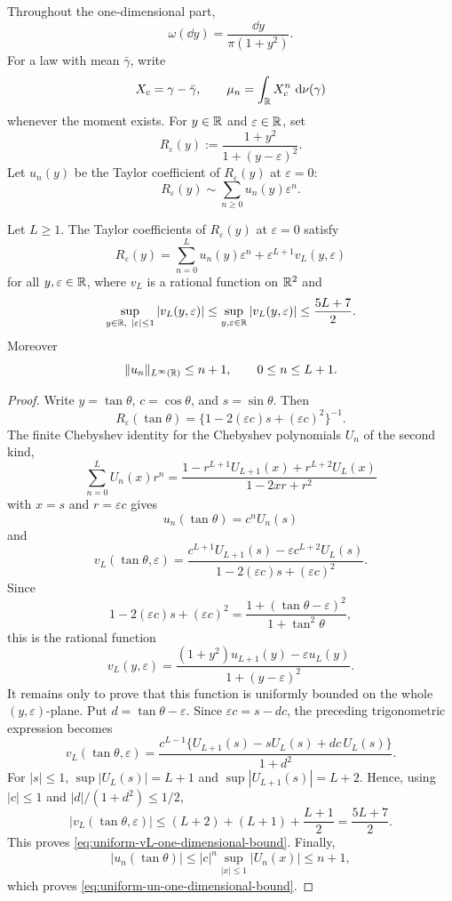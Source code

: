 Throughout the one-dimensional part,
\[
  \omega(\dd y)=\frac{\dd y}{\pi(1+y^2)}.
\]
For a law with mean \(\bar{\gamma}\), write
\[
  X_c=\gamma-\bar{\gamma},\qquad
  \mu_n=\int_{\mathbb{R}} X_c^n\,\,\mathrm{d}\nu(\gamma)
\]
whenever the moment exists.  For \(y\in\mathbb{R}\) and \(\varepsilon\in\mathbb{R}\), set
\[
R_\varepsilon(y):=\frac{1+y^2}{1+(y-\varepsilon)^2}.
\]
Let \(u_n(y)\) be the Taylor coefficient of \(R_\varepsilon(y)\) at
\(\varepsilon=0\):
\[
  R_\varepsilon(y)\sim\sum_{n\ge0}u_n(y)\varepsilon^n .
\]
\begin{lemma}%
\label{lem:uniform-one-dimensional-cayley-taylor-remainder}
Let \(L\ge1\).  The Taylor coefficients of \(R_\varepsilon(y)\) at
\(\varepsilon=0\) satisfy
\[
  R_\varepsilon(y)=\sum_{n=0}^{L}u_n(y)\varepsilon^n
  +\varepsilon^{L+1}v_L(y,\varepsilon)
\]
for all \(y,\varepsilon\in\mathbb{R}\), where \(v_L\) is a rational function on
\(\mathbb{R}^2\) and
\begin{equation}\label{eq:uniform-vL-one-dimensional-bound}
  \sup_{y\in\mathbb{R},\ |\varepsilon|\le1}|v_L(y,\varepsilon)|
  \le \sup_{y,\varepsilon\in\mathbb{R}}|v_L(y,\varepsilon)|
  \le \frac{5L+7}{2}.
\end{equation}
Moreover
\begin{equation}\label{eq:uniform-un-one-dimensional-bound}
  \|u_n\|_{L^\infty(\mathbb{R})}\le n+1,\qquad 0\le n\le L+1 .
\end{equation}
\end{lemma}

\ifdefined\JFAArticleMain
{}
\else
\begin{proof}
Write \(y=\tan\theta\), \(c=\cos\theta\), and \(s=\sin\theta\).  Then
\[
R_\varepsilon(\tan\theta)
=\{1-2(\varepsilon c)s+(\varepsilon c)^2\}^{-1}.
\]
The finite Chebyshev identity for the Chebyshev polynomials \(U_n\) of the
second kind,
\[
\sum_{n=0}^{L}U_n(x)r^n
=\frac{1-r^{L+1}U_{L+1}(x)+r^{L+2}U_L(x)}
       {1-2xr+r^2}
\]
with \(x=s\) and \(r=\varepsilon c\) gives
\[
  u_n(\tan\theta)=c^nU_n(s)
\]
and
\[
v_L(\tan\theta,\varepsilon)
=\frac{c^{L+1}U_{L+1}(s)-\varepsilon c^{L+2}U_L(s)}
       {1-2(\varepsilon c)s+(\varepsilon c)^2}.
\]
Since
\[
1-2(\varepsilon c)s+(\varepsilon c)^2
=\frac{1+(\tan\theta-\varepsilon)^2}{1+\tan^2\theta},
\]
this is the rational function
\[
v_L(y,\varepsilon)
=\frac{(1+y^2)u_{L+1}(y)-\varepsilon u_L(y)}
       {1+(y-\varepsilon)^2}.
\]
It remains only to prove that this function is uniformly bounded on the whole
\((y,\varepsilon)\)-plane.  Put \(d=\tan\theta-\varepsilon\).  Since
\(\varepsilon c=s-dc\), the preceding trigonometric expression becomes
\[
v_L(\tan\theta,\varepsilon)
=\frac{c^{L-1}\{U_{L+1}(s)-sU_L(s)+dc\,U_L(s)\}}
       {1+d^2}.
\]
For \(|s|\le1\), \(\sup |U_L(s)|=L+1\) and
\(\sup |U_{L+1}(s)|=L+2\).  Hence, using
\(|c|\le1\) and \(|d|/(1+d^2)\le1/2\),
\[
|v_L(\tan\theta,\varepsilon)|
\le (L+2)+(L+1)+\frac{L+1}{2}
=\frac{5L+7}{2}.
\]
This proves \eqref{eq:uniform-vL-one-dimensional-bound}.  Finally,
\[
  |u_n(\tan\theta)|\le |c|^n\sup_{|x|\le1}|U_n(x)|\le n+1,
\]
which proves \eqref{eq:uniform-un-one-dimensional-bound}.
\end{proof}
\fi

